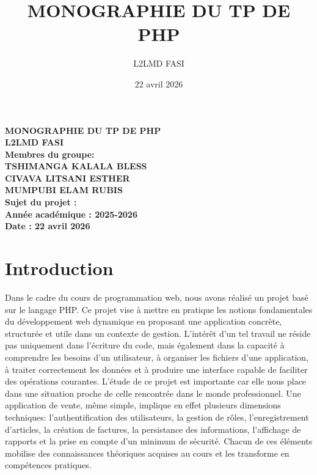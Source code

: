 \documentclass[12pt,a4paper]{article}
\title{MONOGRAPHIE DU TP DE PHP}
\author{L2LMD FASI}
\date{22 avril 2026}
\begin{document}
\thispagestyle{empty}
\begin{center}
\vspace*{\fill}
\textbf{MONOGRAPHIE DU TP DE PHP} \\
\vspace{0.8cm}
\textbf{L2LMD FASI} \\
\vspace{1.5cm}
\textbf{Membres du groupe:} \\
\vspace{0.7cm}
\textbf{TSHIMANGA KALALA BLESS } \\
\vspace{1cm}
\textbf{CIVAVA LITSANI ESTHER} \\
\vspace{1cm}
\textbf{MUMPUBI ELAM RUBIS} \\
\vspace{1.5cm}
\textbf{Sujet du projet :} \\
\vspace{1.5cm}
\textbf{Année académique : 2025-2026} \\
\vspace{0.5cm}
\textbf{Date : 22 avril 2026}
\vspace*{\fill}

\end{center}
\newpage
\tableofcontents
\newpage


\section{Introduction }

Dans le cadre du cours de programmation web, nous avons réalisé un projet basé sur le langage PHP. Ce projet vise à mettre en pratique les notions fondamentales du développement web dynamique en proposant une application concrète, structurée et utile dans un contexte de gestion. L'intérêt d'un tel travail ne réside pas uniquement dans l'écriture du code, mais également dans la capacité à comprendre les besoins d'un utilisateur, à organiser les fichiers d'une application, à traiter correctement les données et à produire une interface capable de faciliter des opérations courantes.
L'étude de ce projet est importante car elle nous place dans une situation proche de celle rencontrée dans le monde professionnel. Une application de vente, même simple, implique en effet plusieurs dimensions techniques: l'authentification des utilisateurs, la gestion de rôles, l'enregistrement d'articles, la création de factures, la persistance des informations, l'affichage de rapports et la prise en compte d'un minimum de sécurité. Chacun de ces éléments mobilise des connaissances théoriques acquises au cours et les transforme en compétences pratiques.
\end{document}
